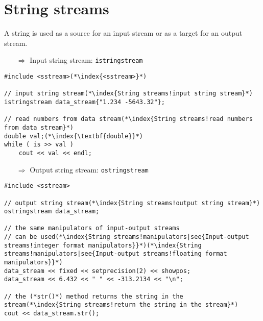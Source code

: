 \documentclass[10pt]{article}
\begin{document}
\section{String streams}
\small
A string is used as a source for an input stream or as a target for an output stream. \\
\begin{enumerate}
\item[$\Rightarrow$] Input string stream: \texttt{istringstream}
\end{enumerate}
\begin{lstlisting}
#include <sstream>(*\index{<sstream>}*)

// input string stream(*\index{String streams!input string stream}*)
istringstream data_stream{"1.234 -5643.32"};

// read numbers from data stream(*\index{String streams!read numbers from data stream}*)
double val;(*\index{\textbf{double}}*)
while ( is >> val )
    cout << val << endl;
\end{lstlisting}
\begin{enumerate}
\item[$\Rightarrow$] Output string stream: \texttt{ostringstream}
\end{enumerate}
\begin{lstlisting}
#include <sstream>

// output string stream(*\index{String streams!output string stream}*)
ostringstream data_stream;

// the same manipulators of input-output streams
// can be used(*\index{String streams!manipulators|see{Input-output streams!integer format manipulators}}*)(*\index{String streams!manipulators|see{Input-output streams!floating format manipulators}}*)
data_stream << fixed << setprecision(2) << showpos;
data_stream << 6.432 << " " << -313.2134 << "\n";

// the (*str()*) method returns the string in the stream(*\index{String streams!return the string in the stream}*)
cout << data_stream.str();
\end{lstlisting}
%
%
\end{document}
